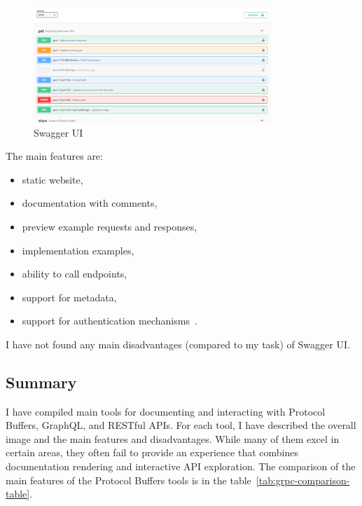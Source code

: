 \begin{figure}[hbt!]
    \centering
    \captionsetup{justification=centering}
    \includegraphics[width=0.8\textwidth]{images/rest/swagger-ui}
    \caption{Swagger UI~\cite{rest-swagger-ui}}
    \label{fig:rest-swagger-ui}
\end{figure}

The main features are:
\begin{itemize}
    \item static website,
    \item documentation with comments,
    \item preview example requests and responses,
    \item implementation examples,
    \item ability to call endpoints,
    \item support for metadata,
    \item support for authentication mechanisms~\cite{rest-swagger-ui}.
\end{itemize}

I have not found any main disadvantages (compared to my task) of Swagger UI\@.

\subsection{Summary}
I have compiled main tools for documenting and interacting with Protocol Buffers, GraphQL, and RESTful APIs.
For each tool, I have described the overall image and the main features and disadvantages.
While many of them excel in certain areas, they often fail to provide an experience that combines documentation rendering and interactive API exploration.
The comparison of the main features of the Protocol Buffers tools is in the table~\ref{tab:grpc-comparison-table}.

